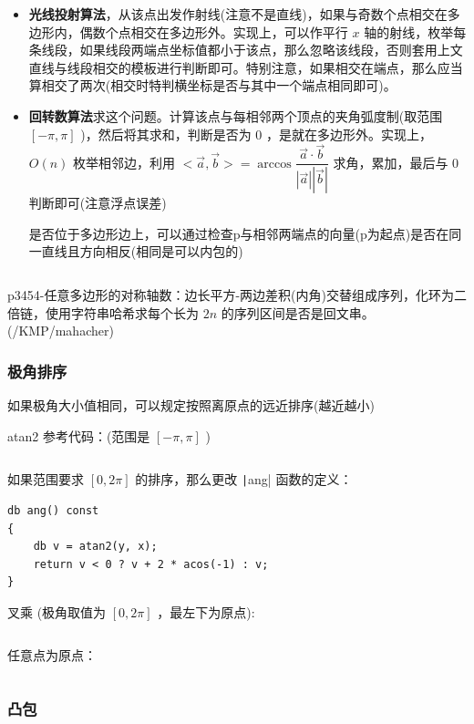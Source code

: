 \documentclass[twocolumn,10pt]{ctexart}
\begin{document}
\begin{itemize}
\item \textbf{光线投射算法}，从该点出发作射线(注意不是直线)，如果与奇数个点相交在多边形内，偶数个点相交在多边形外。实现上，可以作平行 $x$ 轴的射线，枚举每条线段，如果线段两端点坐标值都小于该点，那么忽略该线段，否则套用上文直线与线段相交的模板进行判断即可。特别注意，如果相交在端点，那么应当算相交了两次(相交时特判横坐标是否与其中一个端点相同即可)。
\item \textbf{回转数算法}求这个问题。计算该点与每相邻两个顶点的夹角弧度制(取范围 $[-\pi,\pi]$ )，然后将其求和，判断是否为 $0$ ，是就在多边形外。实现上，$O(n)$ 枚举相邻边，利用 $<\vec a,\allowbreak{}\vec b>=\arccos\dfrac{\vec a\cdot\vec b}{|\vec a||\vec b|}$ 求角，累加，最后与 $0$ 判断即可(注意浮点误差)

是否位于多边形边上，可以通过检查p与相邻两端点的向量(p为起点)是否在同一直线且方向相反(相同是可以内包的)
\end{itemize}

\inputminted{cpp}{code/ext_014.cpp}

p3454-任意多边形的对称轴数：边长平方-两边差积(内角)交替组成序列，化环为二倍链，使用字符串哈希求每个长为 $2n$ 的序列区间是否是回文串。(/KMP/mahacher)

\subsubsection{极角排序}

如果极角大小值相同，可以规定按照离原点的远近排序(越近越小)

atan2 参考代码：(范围是 $[-\pi,\pi]$ )

\inputminted{cpp}{code/sortby_polar_angle_1.cpp}

如果范围要求 $[0,2\pi]$ 的排序，那么更改 \texttt|ang| 函数的定义：

\begin{verbatim}
db ang() const
{
    db v = atan2(y, x);
    return v < 0 ? v + 2 * acos(-1) : v;
}
\end{verbatim}

叉乘 (极角取值为 $[0,2\pi]$ ，最左下为原点):

\inputminted{cpp}{code/sortby_polar_angle_2.cpp}

任意点为原点：

\inputminted{cpp}{code/sortby_polar_angle_3.cpp}

\subsubsection{凸包}
\end{document}
